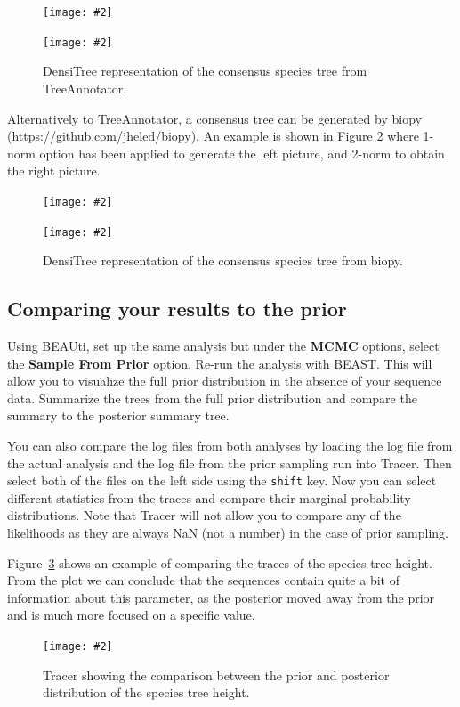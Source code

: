 \documentclass{article}
\newcommand{\includeimage}[2][]{%
\texttt{[image: \#2]}
}
\begin{document}
\begin{figure}[h]
\centering
\includeimage[scale=0.18]{figures/species_population1}
\includeimage[scale=0.18]{figures/species_population2}
\caption{\label{fig.DensiTree.part1} DensiTree representation of the consensus species tree from TreeAnnotator.}
\end{figure}

Alternatively to TreeAnnotator, a consensus tree can be generated by biopy (\url{https://github.com/jheled/biopy}). An example is shown in Figure \ref{fig.DensiTree.part2} where 1-norm option has been applied to generate the left picture, and 2-norm to obtain the right picture.

\begin{figure}[h]
\centering
\includeimage[scale=0.18]{figures/species_population4}
\includeimage[scale=0.18]{figures/species_population5}
\caption{\label{fig.DensiTree.part2} DensiTree representation of the consensus species tree from biopy.}
\end{figure}

\subsection{Comparing your results to the prior}

Using BEAUti, set up the same analysis but under the {\bf MCMC} options, select the {\bf Sample From Prior} option. Re-run the analysis with BEAST. This will allow you to visualize the full prior distribution in the absence of your sequence data. Summarize the trees from the full prior distribution and compare the summary to the posterior summary tree.

You can also compare the log files from both analyses by loading the log file from the actual analysis and the log file from the prior sampling run into Tracer. Then select both of the files on the left side using the \texttt{shift} key. Now you can select different statistics from the traces and compare their marginal probability distributions. Note that Tracer will not allow you to compare any of the likelihoods as they are always NaN (not a number) in the case of prior sampling.

Figure~\ref{fig.tracerPrior} shows an example of comparing the traces of the species tree height. From the plot we can conclude that the sequences contain quite a bit of information about this parameter, as the posterior moved away from the prior and is much more focused on a specific value.

\begin{figure}[h]
\centering
\includeimage[width=\textwidth]{figures/Tracer_compareToPrior}
\caption{\label{fig.tracerPrior} Tracer showing the comparison between the prior and posterior distribution of the species tree height.}
\end{figure}
\end{document}
